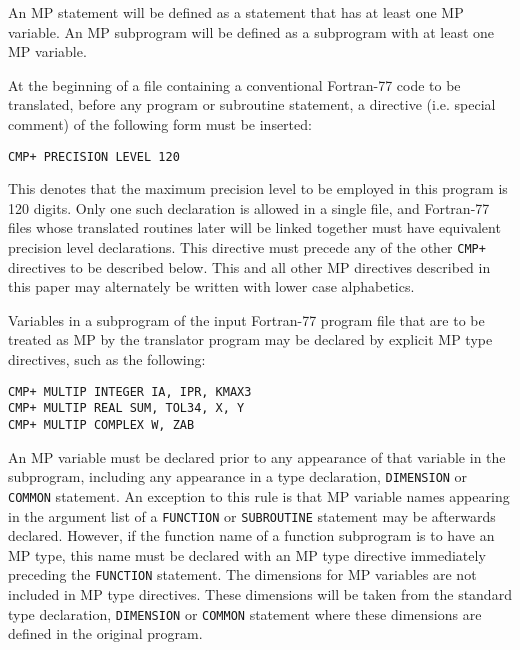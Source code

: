 \vspace{2ex} 

\noindent
An MP statement will be defined as a statement that has at least one
MP variable.  An MP subprogram will be defined as a subprogram with at
least one MP variable.

At the beginning of a file containing a conventional Fortran-77 code
to be translated, before any program or subroutine statement, a
directive (i.e. special comment) of the following form must be
inserted:
 
\begin{tt} \begin{small} \begin{verbatim}
CMP+ PRECISION LEVEL 120
\end{verbatim} \end{small} \end{tt}
 
\noindent
This denotes that the maximum precision level to be employed in this
program is 120 digits.  Only one such declaration is allowed in a
single file, and Fortran-77 files whose translated routines later will
be linked together must have equivalent precision level declarations.
This directive must precede any of the other {\tt CMP+} directives to
be described below.  This and all other MP directives described in
this paper may alternately be written with lower case alphabetics.
 
Variables in a subprogram of the input Fortran-77 program file that
are to be treated as MP by the translator program may be declared by
explicit MP type directives, such as the following:
 
\begin{tt} \begin{small} \begin{verbatim}
CMP+ MULTIP INTEGER IA, IPR, KMAX3
CMP+ MULTIP REAL SUM, TOL34, X, Y
CMP+ MULTIP COMPLEX W, ZAB
\end{verbatim} \end{small} \end{tt}
 
\noindent
An MP variable must be declared prior to any appearance of that
variable in the subprogram, including any appearance in a type
declaration, {\tt DIMENSION} or {\tt COMMON} statement.  An exception
to this rule is that MP variable names appearing in the argument list
of a {\tt FUNCTION} or {\tt SUBROUTINE} statement may be afterwards
declared.  However, if the function name of a function subprogram is
to have an MP type, this name must be declared with an MP type
directive immediately preceding the {\tt FUNCTION} statement.  The
dimensions for MP variables are not included in MP type directives.
These dimensions will be taken from the standard type declaration,
{\tt DIMENSION} or {\tt COMMON} statement where these dimensions are
defined in the original program.
 
